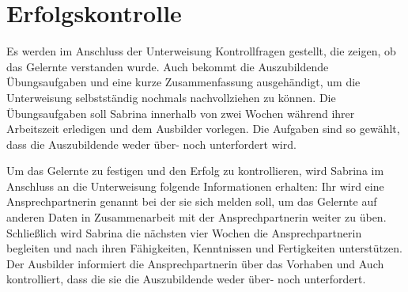 \section{Erfolgskontrolle}\label{kap3:erfolg}
Es werden im Anschluss der Unterweisung Kontrollfragen gestellt, die zeigen, ob das Gelernte verstanden wurde. Auch bekommt die Auszubildende Übungsaufgaben und eine kurze Zusammenfassung ausgehändigt, um die Unterweisung selbstständig nochmals nachvollziehen zu können. Die Übungsaufgaben soll Sabrina innerhalb von zwei Wochen während ihrer Arbeitszeit erledigen und dem Ausbilder vorlegen. Die Aufgaben sind so gewählt, dass die Auszubildende weder über- noch unterfordert wird.
\par
Um das Gelernte zu festigen und den Erfolg zu kontrollieren, wird Sabrina im Anschluss an die Unterweisung folgende Informationen erhalten: Ihr wird eine Ansprechpartnerin genannt bei der sie sich melden soll, um das Gelernte auf anderen Daten in Zusammenarbeit mit der Ansprechpartnerin weiter zu üben. Schließlich wird Sabrina die nächsten vier Wochen die Ansprechpartnerin begleiten und nach ihren Fähigkeiten, Kenntnissen und Fertigkeiten unterstützen. Der Ausbilder informiert die Ansprechpartnerin über das Vorhaben und Auch kontrolliert, dass die sie die Auszubildende weder über- noch unterfordert. 


